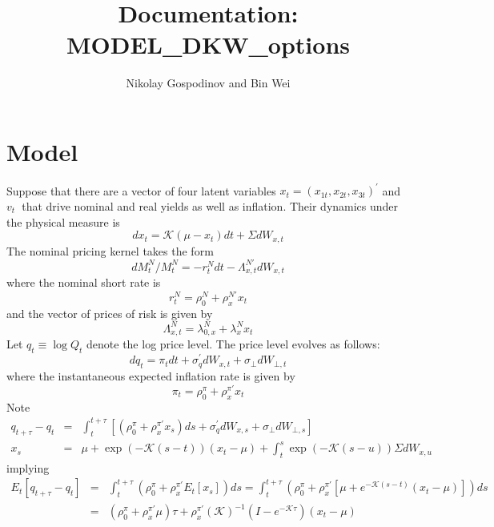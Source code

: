 \documentclass{article}
\begin{document}
\title{Documentation: MODEL\_DKW\_options}
\author{Nikolay Gospodinov and Bin Wei}
\maketitle

\section{Model}

Suppose that there are a vector of four latent variables $x_{t}=\left(
x_{1t},x_{2t},x_{3t}\right) ^{\prime }$ and $v_{t}$\textbf{\ }that drive
nominal and real yields as well as inflation. Their dynamics under the
physical measure is%
\begin{equation}
dx_{t}=\mathcal{K}\left( \mu -x_{t}\right) dt+\Sigma dW_{x,t}
\end{equation}%
The nominal pricing kernel takes the form%
\begin{equation}
dM_{t}^{N}/M_{t}^{N}=-r_{t}^{N}dt-\Lambda _{x,t}^{N\prime }dW_{x,t}
\end{equation}%
where the nominal short rate is%
\begin{equation}
r_{t}^{N}=\rho _{0}^{N}+\rho _{x}^{N\prime }x_{t}
\end{equation}%
and the vector of prices of risk is given by\qquad 
\begin{equation*}
\Lambda _{x,t}^{N}=\lambda _{0,x}^{N}+\lambda _{x}^{N}x_{t}
\end{equation*}%
Let $q_{t}\equiv \log Q_{t}$ denote the log price level. The price level
evolves as follows: 
\begin{equation}
dq_{t}=\pi _{t}dt+\sigma _{q}^{\prime }dW_{x,t}+\sigma _{\bot }dW_{\bot ,t}
\end{equation}%
where the instantaneous expected inflation rate is given by 
\begin{equation}
\pi _{t}=\rho _{0}^{\pi }+\rho _{x}^{\pi \prime }x_{t}
\end{equation}%
Note 
\begin{eqnarray*}
q_{t+\tau }-q_{t} &=&\int_{t}^{t+\tau }\left[ \left( \rho _{0}^{\pi }+\rho
_{x}^{\pi \prime }x_{s}\right) ds+\sigma _{q}^{\prime }dW_{x,s}+\sigma
_{\bot }dW_{\bot ,s}\right]  \\
x_{s} &=&\mu +\exp \left( -\mathcal{K}\left( s-t\right) \right) \left(
x_{t}-\mu \right) +\int_{t}^{s}\exp \left( -\mathcal{K}\left( s-u\right)
\right) \Sigma dW_{x,u}
\end{eqnarray*}%
implying%
\begin{eqnarray*}
E_{t}\left[ q_{t+\tau }-q_{t}\right]  &=&\int_{t}^{t+\tau }\left( \rho
_{0}^{\pi }+\rho _{x}^{\pi \prime }E_{t}\left[ x_{s}\right] \right)
ds=\int_{t}^{t+\tau }\left( \rho _{0}^{\pi }+\rho _{x}^{\pi \prime }\left[
\mu +e^{-\mathcal{K}\left( s-t\right) }\left( x_{t}-\mu \right) \right]
\right) ds \\
&=&\left( \rho _{0}^{\pi }+\rho _{x}^{\pi \prime }\mu \right) \tau +\rho
_{x}^{\pi \prime }\left( \mathcal{K}\right) ^{-1}\left( I-e^{-\mathcal{K}%
\tau }\right) \left( x_{t}-\mu \right) 
\end{eqnarray*}%
\end{document}

